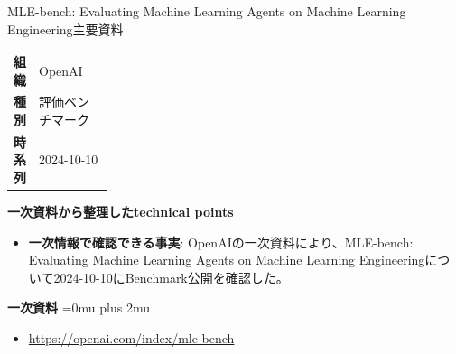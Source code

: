 \begin{technicalnote}{MLE-bench: Evaluating Machine Learning Agents on Machine Learning Engineering}{主要資料}
\begingroup
\begin{tabularx}{\linewidth}{@{}>{\bfseries}p{0.22\linewidth}X@{}}
組織 & OpenAI \\
種別 & 評価ベンチマーク \\
時系列 & 2024-10-10 \\
\end{tabularx}
\smallskip
{\bfseries 一次資料から整理したtechnical points}
\begin{itemize}[leftmargin=1.5em,itemsep=0.35em]
\item \textbf{一次情報で確認できる事実}: OpenAIの一次資料により、MLE-bench: Evaluating Machine Learning Agents on Machine Learning Engineeringについて2024-10-10にBenchmark公開を確認した。
\end{itemize}
\begin{minipage}{\linewidth}
\begin{samepage}
{\bfseries 一次資料}
\begingroup\sloppy
\Urlmuskip=0mu plus 2mu\relax
\begin{itemize}[leftmargin=1.5em,itemsep=0.25em]
\item {\scriptsize\url{https://openai.com/index/mle-bench}}
\end{itemize}
\endgroup
\end{samepage}
\end{minipage}
\endgroup
\end{technicalnote}
\medskip

